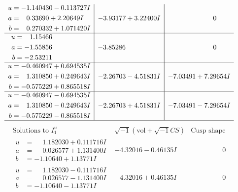 \documentclass[1p]{elsarticle_modified}
\theoremstyle{definition}
\newcommand{\I}{\sqrt{-1}}
\begin{document}
$$\begin{array}{c|c|c}
\begin{aligned}
u &= -1.140430 - 0.113727 I \\
a &= \phantom{-}0.33690 + 2.20649 I \\
b &= \phantom{-}0.270332 + 1.071420 I\end{aligned}
 & -3.93177 + 3.22400 I & \phantom{-0.000000 } 0 \\ \hline\begin{aligned}
u &= \phantom{-}1.15466\phantom{ +0.000000I} \\
a &= -1.55856\phantom{ +0.000000I} \\
b &= -2.53211\phantom{ +0.000000I}\end{aligned}
 & -3.85286\phantom{ +0.000000I} & \phantom{-0.000000 } 0 \\ \hline\begin{aligned}
u &= -0.460947 + 0.694535 I \\
a &= \phantom{-}1.310850 + 0.249643 I \\
b &= -0.575229 + 0.865518 I\end{aligned}
 & -2.26703 - 4.51831 I & -7.03491 + 7.29654 I \\ \hline\begin{aligned}
u &= -0.460947 - 0.694535 I \\
a &= \phantom{-}1.310850 - 0.249643 I \\
b &= -0.575229 - 0.865518 I\end{aligned}
 & -2.26703 + 4.51831 I & -7.03491 - 7.29654 I\\
 \hline 
 \end{array}$$\newpage$$\begin{array}{c|c|c}  
\text{Solutions to }I^u_{1}& \I (\text{vol} + \sqrt{-1}CS) & \text{Cusp shape}\\
 \hline 
\begin{aligned}
u &= \phantom{-}1.182030 + 0.111716 I \\
a &= \phantom{-}0.026577 + 1.131400 I \\
b &= -1.10640 + 1.13771 I\end{aligned}
 & -4.32016 - 0.46135 I & \phantom{-0.000000 } 0 \\ \hline\begin{aligned}
u &= \phantom{-}1.182030 - 0.111716 I \\
a &= \phantom{-}0.026577 - 1.131400 I \\
b &= -1.10640 - 1.13771 I\end{aligned}
 & -4.32016 + 0.46135 I & \phantom{-0.000000 } 0 \\ \hline\begin{aligned}

\end{aligned}
\end{array}$$
\end{document}
